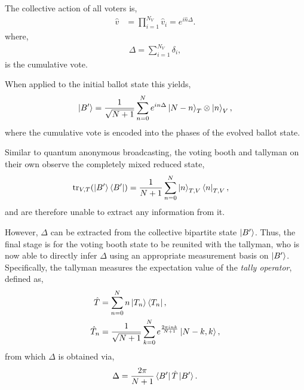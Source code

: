 The collective action of all voters is,
\begin{align}
\hat{v} &= \prod_{i=1}^{N_V} \hat{v}_i = e^{i\hat{n}\Delta}.
\end{align}
where,
\begin{align}
\Delta = \sum_{i=1}^{N_V} \delta_i,
\end{align}
is the cumulative vote.

When applied to the initial ballot state this yields,
\begin{align}
\ket{B'} = \frac{1}{\sqrt{N+1}} \sum_{n=0}^N e^{in\Delta} \ket{N-n}_T\otimes\ket{n}_V,
\end{align}
where the cumulative vote is encoded into the phases of the evolved ballot state.

Similar to quantum anonymous broadcasting, the voting booth and tallyman on their own observe the completely mixed reduced state,
\begin{align}
\mathrm{tr}_{V,T}(\ket{B'}\bra{B'}) &= \frac{1}{N+1} \sum_{n=0}^N \ket{n}_{T,V}\bra{n}_{T,V},
\end{align}
and are therefore unable to extract any information from it.

However, $\Delta$ can be extracted from the collective bipartite state $\ket{B'}$. Thus, the final stage is for the voting booth state to be reunited with the tallyman, who is now able to directly infer $\Delta$ using an appropriate measurement basis on $\ket{B'}$. Specifically, the tallyman measures the expectation value of the \emph{tally operator}, defined as,
\begin{align}
\hat{T} &= \sum_{n=0}^N n\ket{T_n}\bra{T_n},\nonumber\\
\hat{T}_n &= \frac{1}{\sqrt{N+1}} \sum_{k=0}^N e^\frac{2\pi ink}{N+1} \ket{N-k,k},
\end{align}
from which $\Delta$ is obtained via,
\begin{align}
\Delta = \frac{2\pi}{N+1}\bra{B'}\hat{T}\ket{B'}.
\end{align}

